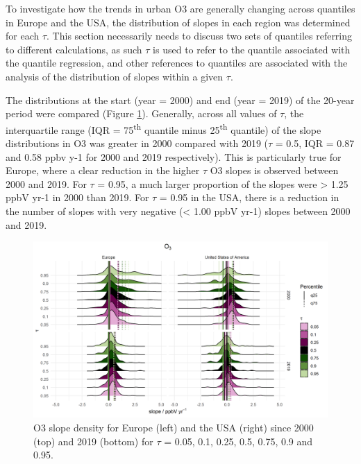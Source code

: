 \documentclass[journal abbreviation, manuscript]{copernicus}
\begin{document}
To investigate how the trends in urban O3 are generally changing across quantiles in Europe and the USA, the distribution of slopes in each region was determined for each $\tau$. This section necessarily needs to discuss two sets of quantiles referring to different calculations, as such $\tau$ is used to refer to the quantile associated with the quantile regression, and other references to quantiles are associated with the analysis of the distribution of slopes within a given $\tau$.

The distributions at the start (year = 2000) and end (year = 2019) of the 20-year period were compared (Figure \ref{o3_ridge_plot}). Generally, across all values of $\tau$, the interquartile range (IQR = 75\textsuperscript{th} quantile minus 25\textsuperscript{th} quantile) of the slope distributions in O3 was greater in 2000 compared with 2019 ($\tau$ = 0.5, IQR = 0.87 and 0.58 ppbv y-1 for 2000 and 2019 respectively). This is particularly true for Europe, where a clear reduction in the higher $\tau$ O3 slopes is observed between 2000 and 2019. For $\tau$ = 0.95, a much larger proportion of the slopes were > 1.25 ppbV yr-1 in 2000 than 2019. For $\tau$ = 0.95 in the USA, there is a reduction in the number of slopes with very negative (< 1.00 ppbV yr-1) slopes between 2000 and 2019.

\begin{figure}[h!]
\includegraphics[width=12cm]{plots/o3_density_ridges_by_tau_continent_2000_2019.png}
\caption{O3 slope density for Europe (left) and the USA (right) since 2000 (top) and 2019 (bottom) for $\tau$ = 0.05, 0.1, 0.25, 0.5, 0.75, 0.9 and 0.95.}
\label{o3_ridge_plot}
\end{figure}
\end{document}
